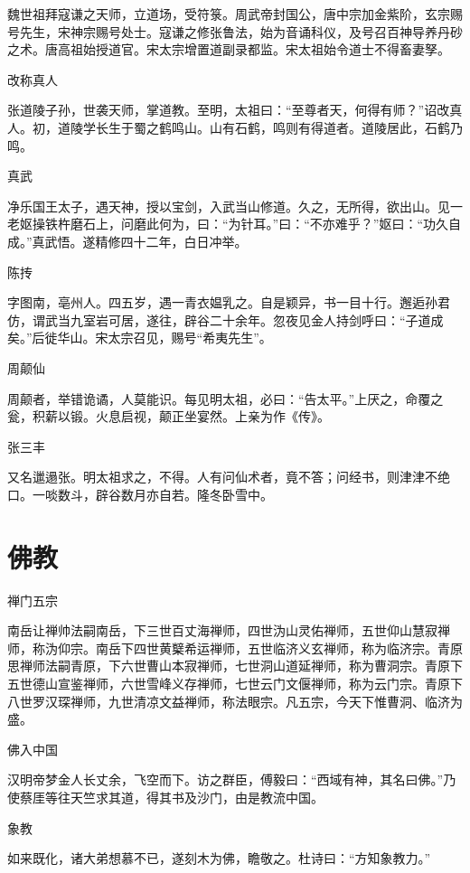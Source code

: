 \documentclass[a4paper,12pt,UTF8,twoside]{ctexbook}
\begin{document}
    魏世祖拜寇谦之天师，立道场，受符箓。周武帝封国公，唐中宗加金紫阶，玄宗赐号先生，宋神宗赐号处士。寇谦之修张鲁法，始为音诵科仪，及号召百神导养丹砂之术。唐高祖始授道官。宋太宗增置道副录都监。宋太祖始令道士不得畜妻孥。
    
    改称真人
    
    张道陵子孙，世袭天师，掌道教。至明，太祖曰：“至尊者天，何得有师？”诏改真人。初，道陵学长生于蜀之鹤鸣山。山有石鹤，鸣则有得道者。道陵居此，石鹤乃鸣。
    
    真武
    
    净乐国王太子，遇天神，授以宝剑，入武当山修道。久之，无所得，欲出山。见一老妪操铁杵磨石上，问磨此何为，曰：“为针耳。”曰：“不亦难乎？”妪曰：“功久自成。”真武悟。遂精修四十二年，白日冲举。
    
    陈抟
    
    字图南，亳州人。四五岁，遇一青衣媪乳之。自是颖异，书一目十行。邂逅孙君仿，谓武当九室岩可居，遂往，辟谷二十余年。忽夜见金人持剑呼曰：“子道成矣。”后徙华山。宋太宗召见，赐号“希夷先生”。
    
    周颠仙
    
    周颠者，举错诡谲，人莫能识。每见明太祖，必曰：“告太平。”上厌之，命覆之瓮，积薪以锻。火息启视，颠正坐宴然。上亲为作《传》。
    
    张三丰
    
    又名邋遢张。明太祖求之，不得。人有问仙术者，竟不答；问经书，则津津不绝口。一啖数斗，辟谷数月亦自若。隆冬卧雪中。
    
    \chapter{佛教}
    
    禅门五宗
    
    南岳让禅帅法嗣南岳，下三世百丈海禅师，四世沩山灵佑禅师，五世仰山慧寂禅师，称沩仰宗。南岳下四世黄櫱希运禅师，五世临济义玄禅师，称为临济宗。青原思禅师法嗣青原，下六世曹山本寂禅师，七世洞山道延禅师，称为曹洞宗。青原下五世德山宣鉴禅师，六世雪峰义存禅师，七世云门文偃禅师，称为云门宗。青原下八世罗汉琛禅师，九世清凉文益禅师，称法眼宗。凡五宗，今天下惟曹洞、临济为盛。
    
    佛入中国
    
    汉明帝梦金人长丈余，飞空而下。访之群臣，傅毅曰：“西域有神，其名曰佛。”乃使蔡厓等往天竺求其道，得其书及沙门，由是教流中国。
    
    象教
    
    如来既化，诸大弟想慕不已，遂刻木为佛，瞻敬之。杜诗曰：“方知象教力。”
    
\end{document}
